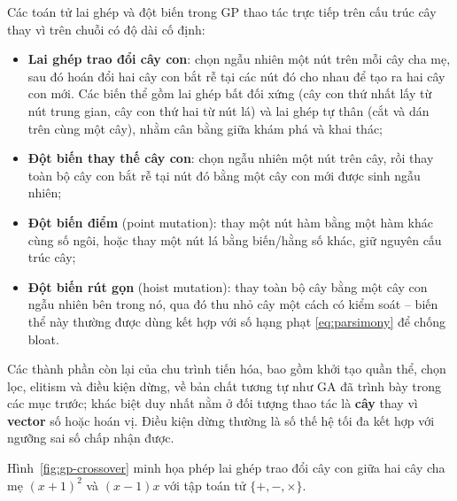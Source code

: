 Các toán tử lai ghép và đột biến trong GP thao tác trực tiếp trên cấu
trúc cây thay vì trên chuỗi có độ dài cố định:
\begin{itemize}
    \item \textbf{Lai ghép trao đổi cây con}: chọn
    ngẫu nhiên một nút trên mỗi cây cha mẹ, sau đó hoán đổi hai cây con
    bắt rễ tại các nút đó cho nhau để tạo ra hai cây con mới. Các biến
    thể gồm lai ghép bất đối xứng (cây con thứ nhất lấy từ nút trung
    gian, cây con thứ hai từ nút lá) và lai ghép tự thân (cắt và dán trên
    cùng một cây), nhằm cân bằng giữa khám phá và khai thác;
    \item \textbf{Đột biến thay thế cây con}: chọn
    ngẫu nhiên một nút trên cây, rồi thay toàn bộ cây con bắt rễ tại nút
    đó bằng một cây con mới được sinh ngẫu nhiên;
    \item \textbf{Đột biến điểm} (point mutation): thay một nút hàm bằng
    một hàm khác cùng số ngôi, hoặc thay một nút lá bằng biến/hằng số
    khác, giữ nguyên cấu trúc cây;
    \item \textbf{Đột biến rút gọn} (hoist mutation): thay toàn bộ cây
    bằng một cây con ngẫu nhiên bên trong nó, qua đó thu nhỏ cây một
    cách có kiểm soát -- biến thể này thường được dùng kết hợp với số
    hạng phạt \eqref{eq:parsimony} để chống bloat.
\end{itemize}

Các thành phần còn lại của chu trình tiến hóa, bao gồm khởi tạo quần
thể, chọn lọc, elitism và điều kiện dừng, về bản chất tương tự như GA
đã trình bày trong các mục trước; khác biệt duy nhất nằm ở đối tượng
thao tác là \textbf{cây} thay vì \textbf{vector} số hoặc hoán vị.
Điều kiện dừng thường là số thế hệ tối đa kết hợp
với ngưỡng sai số chấp nhận được.

Hình~\ref{fig:gp-crossover} minh họa phép lai ghép trao đổi cây con
giữa hai cây cha mẹ $(x+1)^2$ và $(x-1)x$ với tập toán tử
$\{+,-,\times\}$.

